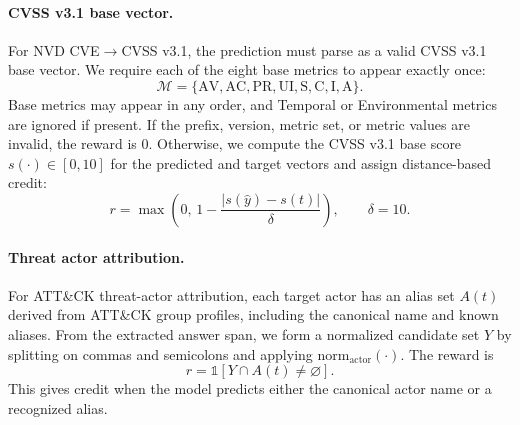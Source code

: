 \paragraph{CVSS v3.1 base vector.}
For NVD CVE$\rightarrow$CVSS v3.1, the prediction must parse as a valid CVSS v3.1 base vector. We require each of the eight base metrics to appear exactly once:
\[
\mathcal{M}
=
\{\mathrm{AV},\mathrm{AC},\mathrm{PR},\mathrm{UI},\mathrm{S},\mathrm{C},\mathrm{I},\mathrm{A}\}.
\]
Base metrics may appear in any order, and Temporal or Environmental metrics are ignored if present. If the prefix, version, metric set, or metric values are invalid, the reward is $0$. Otherwise, we compute the CVSS v3.1 base score $s(\cdot)\in[0,10]$ for the predicted and target vectors and assign distance-based credit:
\[
r
=
\max\!\left(
0,\,
1-\frac{|s(\hat{y})-s(t)|}{\delta}
\right),
\qquad
\delta=10.
\]

\paragraph{Threat actor attribution.}
For ATT\&CK threat-actor attribution, each target actor has an alias set $A(t)$ derived from ATT\&CK group profiles, including the canonical name and known aliases. From the extracted answer span, we form a normalized candidate set $Y$ by splitting on commas and semicolons and applying $\mathrm{norm}_{\mathrm{actor}}(\cdot)$. The reward is
\[
r
=
\mathbb{1}\!\left[
Y\cap A(t)\neq\varnothing
\right].
\]
This gives credit when the model predicts either the canonical actor name or a recognized alias.